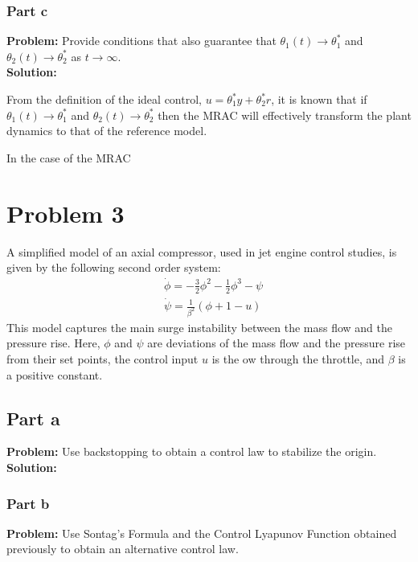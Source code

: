 \documentclass[letter]{article}
\begin{document}
\subsubsection{Part c}
\textbf{Problem:}
Provide conditions that also guarantee that $\theta_1(t) \to \theta_1^*$ and $\theta_2(t) \to \theta_2^*$ as $t\to\infty$.\\

\noindent
\textbf{Solution:}

From the definition of the ideal control, $u = \theta_1^* y + \theta_2^* r$, it is known that if $\theta_1(t) \to \theta_1^*$ and $\theta_2(t) \to \theta_2^*$ then the MRAC will effectively transform the plant dynamics to that of the reference model.

In the case of the MRAC 














\newpage
\section{Problem 3}
A simplified model of an axial compressor, used in jet engine control studies, is given by the following second order system:
\begin{equation}
	\begin{aligned}
		&\dot{\phi} = - \frac{3}{2} \phi^2 - \frac{1}{2} \phi^3 - \psi\\
		&\dot{\psi} = \frac{1}{\beta^2}(\phi + 1 - u)
	\end{aligned}
\end{equation}
This model captures the main surge instability between the mass flow and the pressure rise. Here, $\phi$ and $\psi$ are deviations of the mass flow and the pressure rise from their set points, the control input $u$ is the 
ow through the throttle, and $\beta$ is a positive constant.

\subsection{Part a}
\textbf{Problem:}
Use backstopping to obtain a control law to stabilize the origin.\\

\noindent
\textbf{Solution:}



\subsubsection{Part b}
\textbf{Problem:}
Use Sontag's Formula and the Control Lyapunov Function obtained previously to obtain an alternative control law.\\
\end{document}
